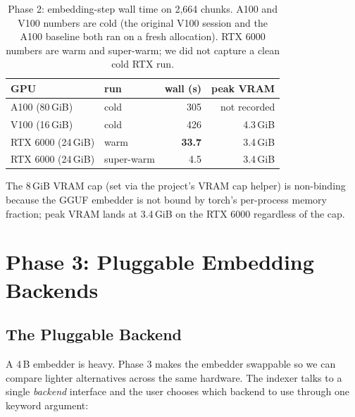 \documentclass[sigconf]{acmart}
\newcommand{\shivam}[1]{\textcolor{teal}{[shivam: #1]}}
\begin{document}
\begin{table}[h]
\caption{Phase 2: embedding-step wall time on 2{,}664 chunks. A100 and
V100 numbers are cold (the original V100 session and the A100 baseline
both ran on a fresh allocation). RTX 6000 numbers are warm and
super-warm; we did not capture a clean cold RTX run.}
\label{tab:phase2}
\begin{tabular}{llrr}
\toprule
GPU & run & wall (s) & peak VRAM \\
\midrule
A100 (80\,GiB)     & cold       & 305    & not recorded \\
V100 (16\,GiB)     & cold       & 426    & 4.3\,GiB \\
RTX 6000 (24\,GiB) & warm       & \textbf{33.7} & 3.4\,GiB \\
RTX 6000 (24\,GiB) & super-warm & 4.5    & 3.4\,GiB \\
\bottomrule
\end{tabular}
\end{table}

The 8\,GiB VRAM cap (set via the project's VRAM cap helper) is
non-binding because the GGUF embedder is not bound by torch's
per-process memory fraction; peak VRAM lands at 3.4\,GiB on the RTX
6000 regardless of the cap.


\section{Phase 3: Pluggable Embedding Backends}

\subsection{The Pluggable Backend}

A 4\,B embedder is heavy. Phase 3 makes the embedder swappable so we
can compare lighter alternatives across the same hardware. The indexer
talks to a single \emph{backend} interface and the user chooses which
backend to use through one keyword argument:
\end{document}
